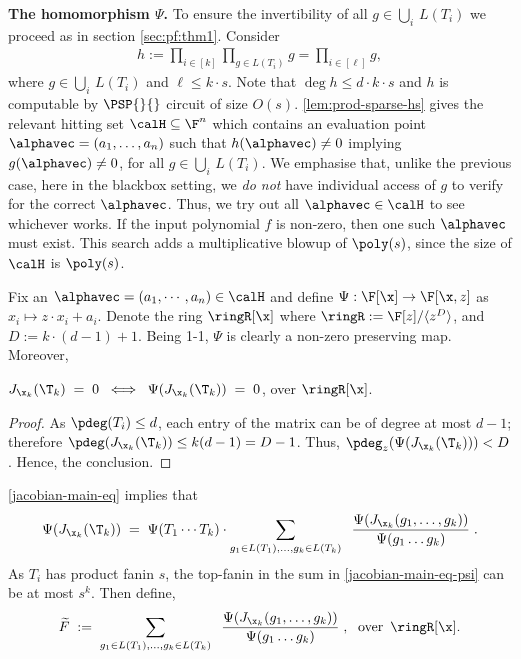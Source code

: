 \textbf{The homomorphism $\Psi$.} To ensure the invertibility of all $g \in \bigcup_{i}\,L(T_i)$ we proceed as in section \ref{sec:pf:thm1}. Consider 
\begin{align*}
    h := \prod_{i \in [k]} \prod_{g \in L(T_i)} g = \prod_{i \in [\ell]} g,
\end{align*}
where $g \in \bigcup_{i}\,L(T_i)$ and $\ell \leq k \cdot s$. Note that $\deg h \leq d \cdot k \cdot s$ and $h$ is computable by $\PSP{}{}$ circuit of size $O(s)$. \autoref{lem:prod-sparse-hs} gives the relevant hitting set $\calH \subseteq \F^n$ which contains an evaluation point $\alphavec = (a_1, \dots, a_n)$ such that $h(\alphavec) \neq 0$ implying $g(\alphavec) \neq 0$, for all $g \in \bigcup_{i}\,L(T_i)$. We emphasise that, unlike the previous case, here in the blackbox setting, we {\em do not} have individual access of $g$ to verify for the correct $\alphavec$. Thus, we try out all $\alphavec \in \calH$ to see whichever works. If the input polynomial $f$ is non-zero, then one such $\alphavec$ must exist. This search adds a multiplicative blowup of $\poly(s)$, since the size of $\calH$ is $\poly(s)$. 

Fix an $\alphavec = (a_1, \cdots, a_n) \in \calH$ and define $\Psi: \F[\x] \to \F[\x,z]$ as $x_i \mapsto z \cdot x_i + a_i$.
%
Denote the ring $\ringR[\x]$ where $\ringR:=\F[z]/\langle z^D \rangle$, and $D:=k\cdot(d-1)+1$. Being 1-1, $\Psi$ is clearly a non-zero preserving map. Moreover,
\begin{claim}\label{cl:psi-iff}
$J_{{\x}_k}(\T_k)\;=\; 0\; \iff\; \Psi(J_{{\x}_k}(\T_k))\;=\;0 $, over $\ringR[\x]$. 
\end{claim}

\begin{proof}
As $\pdeg(T_i) \le d$, each entry of the matrix can be of degree at most $d-1$; therefore $\pdeg(J_{{\x}_k}(\T_k)) \le  k(d-1)= D-1$. Thus, $\pdeg_{z}(\Psi(J_{{\x}_k}(\T_k))) <D$. Hence, the conclusion.
\end{proof}
\autoref{jacobian-main-eq} implies that 
\begin{align}
    \Psi(J_{{\x}_k}(\T_k))\;=\;\Psi(T_1 \cdots T_k) \cdot \sum_{g_1 \in L(T_1) , \hdots , g_k \in L(T_k)}\;\; \frac{ \Psi(J_{{\x}_k}(g_1,\hdots,g_k))}{\Psi(g_1 \hdots g_k)} \;. \label{jacobian-main-eq-psi}
\end{align}
As $T_i$ has product fanin $s$, the top-fanin in the sum in \autoref{jacobian-main-eq-psi} can be at most $s^k$. Then define, 
\begin{align}
\widetilde{F}\;:=\;\sum_{g_1 \in L(T_1) ,\hdots , g_k \in L(T_k)}\;\; \frac{\Psi(J_{{\x}_k}(g_1,\hdots,g_k))}{\Psi(g_1 \hdots g_k)} \;,\;\text{ over }\,\ringR[\x]. \label{eq:main-eq-F-psi}
\end{align}

